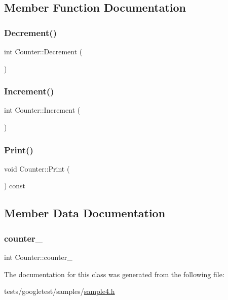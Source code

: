 \subsection{Member Function Documentation}
\mbox{\label{classCounter_aa58d9b4f0bd96fc2331234493eb21bed}} 
\subsubsection{\texorpdfstring{Decrement()}{Decrement()}}
{\footnotesize\ttfamily int Counter\+::\+Decrement (\begin{DoxyParamCaption}{ }\end{DoxyParamCaption})}

\mbox{\label{classCounter_a0a0ca9fdb580a2aec9a5a62ebed2b5ab}} 
\subsubsection{\texorpdfstring{Increment()}{Increment()}}
{\footnotesize\ttfamily int Counter\+::\+Increment (\begin{DoxyParamCaption}{ }\end{DoxyParamCaption})}

\mbox{\label{classCounter_a80092ec2a0deea0870b2e9f8ad0906bd}} 
\subsubsection{\texorpdfstring{Print()}{Print()}}
{\footnotesize\ttfamily void Counter\+::\+Print (\begin{DoxyParamCaption}{ }\end{DoxyParamCaption}) const}



\subsection{Member Data Documentation}
\mbox{\label{classCounter_abdef0bf73f0a68177863c42c6eba2fc0}} 
\subsubsection{\texorpdfstring{counter\+\_\+}{counter\_}}
{\footnotesize\ttfamily int Counter\+::counter\+\_\+\hspace{0.3cm}{\ttfamily [private]}}



The documentation for this class was generated from the following file\+:\begin{DoxyCompactItemize}
\item 
tests/googletest/samples/\hyperlink{sample4_8h}{sample4.\+h}\end{DoxyCompactItemize}

